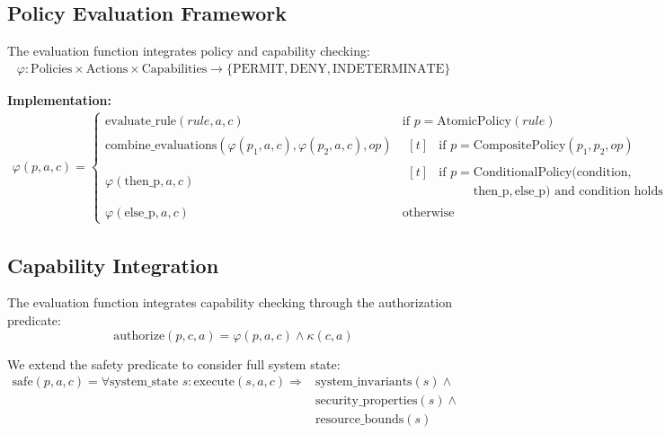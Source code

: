 \subsection{Policy Evaluation Framework}

\begin{definition}
The evaluation function integrates policy and capability checking:
\begin{align}
\varphi: \text{Policies} \times \text{Actions} \times \text{Capabilities} \to \{\text{PERMIT}, \text{DENY}, \text{INDETERMINATE}\}
\end{align}
\end{definition}

\textbf{Implementation:}
\begin{align}
\varphi(p, a, c) = \begin{cases}
\text{evaluate\_rule}(rule, a, c) & \text{if } p = \text{AtomicPolicy}(rule) \\
\text{combine\_evaluations}(\varphi(p_1,a,c), \varphi(p_2,a,c), op) &
\begin{aligned}[t]
&\text{if } p = \text{CompositePolicy}(p_1, p_2, op)
\end{aligned} \\
\varphi(\text{then\_p}, a, c) &
\begin{aligned}[t]
&\text{if } p = \text{ConditionalPolicy}(\text{condition}, \\
&\phantom{\text{if } p = }\text{then\_p}, \text{else\_p}) \text{ and condition holds}
\end{aligned} \\
\varphi(\text{else\_p}, a, c) & \text{otherwise}
\end{cases}
\end{align}

\subsection{Capability Integration}

The evaluation function integrates capability checking through the authorization predicate:
$$\text{authorize}(p, c, a) = \varphi(p, a, c) \land \kappa(c, a)$$

\begin{definition}
We extend the safety predicate to consider full system state:
\begin{align}
\text{safe}(p, a, c) = \forall \text{system\_state } s: \text{execute}(s, a, c) \Rightarrow{} &\text{system\_invariants}(s) \land{} \\
&\text{security\_properties}(s) \land{} \\
&\text{resource\_bounds}(s)
\end{align}
\end{definition}


